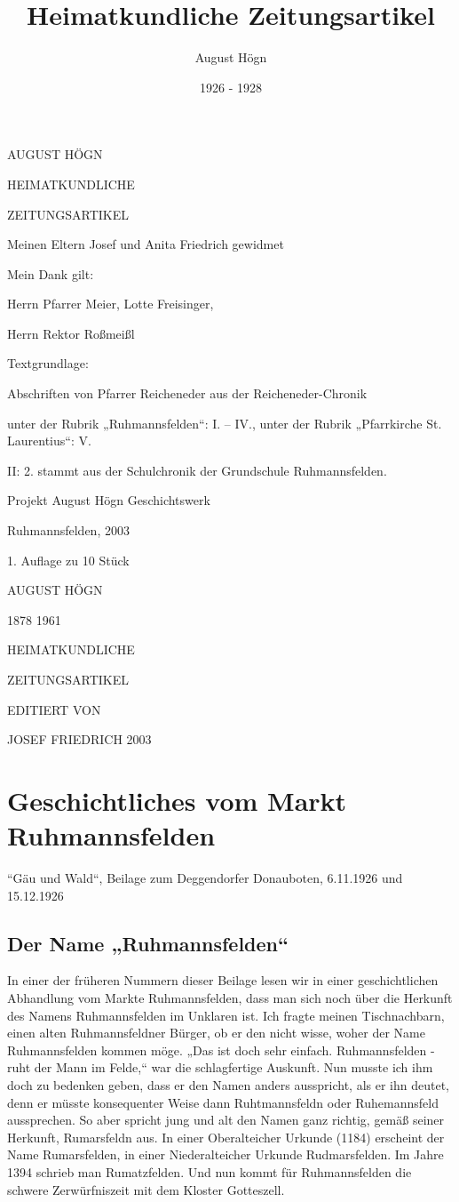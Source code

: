 \documentclass[12pt,a4paper]{book}
\author{August Högn}
\title{Heimatkundliche Zeitungsartikel}
\date{1926 - 1928}
\begin{document}
\maketitle

AUGUST HÖGN

HEIMATKUNDLICHE

ZEITUNGSARTIKEL

Meinen Eltern Josef und Anita Friedrich gewidmet


Mein Dank gilt:

Herrn Pfarrer Meier, Lotte Freisinger,

Herrn Rektor Roßmeißl

Textgrundlage:

Abschriften von Pfarrer Reicheneder aus der Reicheneder-Chronik

unter der Rubrik „Ruhmannsfelden“: I. – IV., unter der Rubrik „Pfarrkirche St.
Laurentius“: V.

II: 2. stammt aus der Schulchronik der Grundschule Ruhmannsfelden.


Projekt August Högn Geschichtswerk

Ruhmannsfelden, 2003

1. Auflage zu 10 Stück

AUGUST HÖGN

1878 1961


HEIMATKUNDLICHE

ZEITUNGSARTIKEL



EDITIERT VON

JOSEF FRIEDRICH 2003

\tableofcontents

\newpage

\chapter{Geschichtliches vom Markt Ruhmannsfelden}

“Gäu und Wald“, Beilage zum Deggendorfer Donauboten, 6.11.1926 und 15.12.1926

\section{Der Name „Ruhmannsfelden“}

In einer der früheren Nummern dieser Beilage lesen wir in einer geschichtlichen
Abhandlung vom Markte Ruhmannsfelden, dass man sich noch über die Herkunft des
Namens Ruhmannsfelden im Unklaren ist. Ich fragte meinen Tischnachbarn, einen
alten Ruhmannsfeldner Bürger, ob er den nicht wisse, woher der Name
Ruhmannsfelden kommen möge. „Das ist doch sehr einfach. Ruhmannsfelden - ruht
der Mann im Felde,“ war die schlagfertige Auskunft. Nun musste ich ihm doch zu
bedenken geben, dass er den Namen anders ausspricht, als er ihn deutet, denn er
müsste konsequenter Weise dann Ruhtmannsfeldn oder Ruhemannsfeld aussprechen. So
aber spricht jung und alt den Namen ganz richtig, gemäß seiner Herkunft,
Rumarsfeldn aus. In einer Oberalteicher Urkunde (1184) erscheint der Name
Rumarsfelden, in einer Niederalteicher Urkunde Rudmarsfelden. Im Jahre 1394
schrieb man Rumatzfelden. Und nun kommt für Ruhmannsfelden die schwere
Zerwürfniszeit mit dem Kloster Gotteszell.
\end{document}
